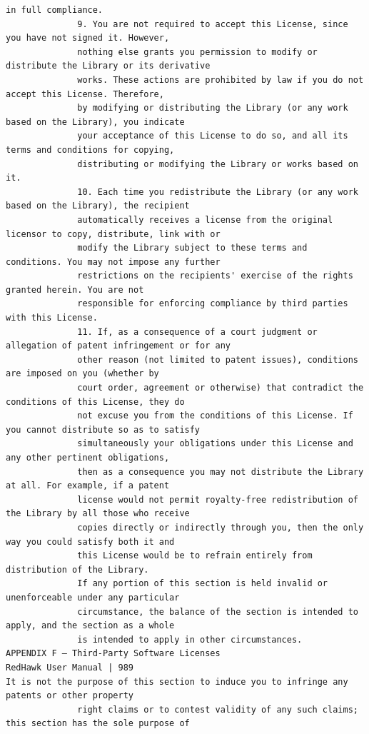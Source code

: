 \begin{lstlisting}[basicstyle=\ttfamily\scriptsize,breaklines=true]
              in full compliance.
              9. You are not required to accept this License, since you have not signed it. However,
              nothing else grants you permission to modify or distribute the Library or its derivative
              works. These actions are prohibited by law if you do not accept this License. Therefore,
              by modifying or distributing the Library (or any work based on the Library), you indicate
              your acceptance of this License to do so, and all its terms and conditions for copying,
              distributing or modifying the Library or works based on it.
              10. Each time you redistribute the Library (or any work based on the Library), the recipient
              automatically receives a license from the original licensor to copy, distribute, link with or
              modify the Library subject to these terms and conditions. You may not impose any further
              restrictions on the recipients' exercise of the rights granted herein. You are not
              responsible for enforcing compliance by third parties with this License.
              11. If, as a consequence of a court judgment or allegation of patent infringement or for any
              other reason (not limited to patent issues), conditions are imposed on you (whether by
              court order, agreement or otherwise) that contradict the conditions of this License, they do
              not excuse you from the conditions of this License. If you cannot distribute so as to satisfy
              simultaneously your obligations under this License and any other pertinent obligations,
              then as a consequence you may not distribute the Library at all. For example, if a patent
              license would not permit royalty-free redistribution of the Library by all those who receive
              copies directly or indirectly through you, then the only way you could satisfy both it and
              this License would be to refrain entirely from distribution of the Library.
              If any portion of this section is held invalid or unenforceable under any particular
              circumstance, the balance of the section is intended to apply, and the section as a whole
              is intended to apply in other circumstances.
APPENDIX F — Third-Party Software Licenses                                    RedHawk User Manual | 989
It is not the purpose of this section to induce you to infringe any patents or other property
              right claims or to contest validity of any such claims; this section has the sole purpose of

\end{lstlisting}
